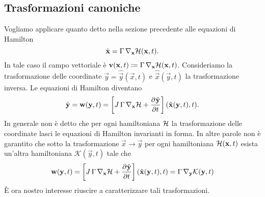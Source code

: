 \subsection{Trasformazioni canoniche}
Vogliamo applicare quanto detto nella sezione precedente alle equazioni di Hamilton
\[
    \dot{\mathbf{x}} = \Gamma \, \nabla_{\mathbf{x}} \mathcal{H}(\mathbf{x}, t).
\]
In tale caso il campo vettoriale è $ \mathbf{v}(\mathbf{x}, t) \coloneqq \Gamma \, \nabla_{\mathbf{x}} \mathcal{H}(\mathbf{x}, t) $. Consideriamo la trasformazione delle coordinate $ \vec{y} = \hat{\vec{y}}(\vec{x}, t) $ e $ \hat{\vec{x}}(\vec{y}, t) $ la trasformazione inversa. Le equazioni di Hamilton diventano
\[
    \dot{\vec{y}} = \vec{w}(\vec{y}, t) = \left[ J \, \Gamma \, \nabla_\vec{x} \ham + \dpd{\hat{\vec{y}}}{t}\right] (\hat{\vec{x}}(\vec{y}, t), t).
\]
In generale non è detto che per ogni hamiltoniana $ \mathcal{H} $ la trasformazione delle coordinate lasci le equazioni di Hamilton invarianti in forma. In altre parole non è garantito che sotto la trasformazione $ \vec{x} \to \vec{y} $ per ogni hamiltoniana $ \mathcal{H}(\mathbf{x}, t) $ esista un'altra hamiltoniana $ \mathcal{K}(\vec{y}, t) $ tale che
\[
    \vec{w}(\vec{y}, t) = \left[ J \, \Gamma \, \nabla_\vec{x} \ham + \dpd{\hat{\vec{y}}}{t}\right] (\hat{\vec{x}}(\vec{y}, t), t) = \Gamma \, \nabla_\vec{y} \mathcal{K}(\vec{y}, t)
\]
È ora nostro interesse riuscire a caratterizzare tali trasformazioni.

